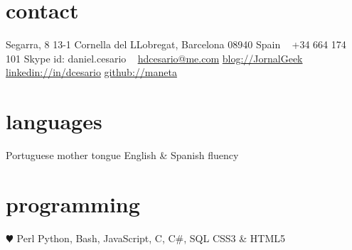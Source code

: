 \documentclass[]{friggeri-cv} %
\begin{document}


\begin{aside} %
\section{contact}
Segarra, 8 13-1
Cornella del LLobregat, Barcelona 08940
Spain
~
+34 664 174 101
Skype id: daniel.cesario
~
\href{mailto:hdcesario@me.com}{hdcesario@me.com}
\href{http://www.jornalgeek.com/author/maneta/}{blog://JornalGeek}
\href{http://es.linkedin.com/in/dcesario/}{linkedin://in/dcesario}
\href{https://github.com/maneta}{github://maneta}
\section{languages}
Portuguese mother tongue
English \& Spanish fluency
\section{programming}
{\color{red} $\varheartsuit$} Perl
Python, Bash, JavaScript, C, C\#, SQL 
CSS3 \& HTML5
\end{aside}

\end{document}
